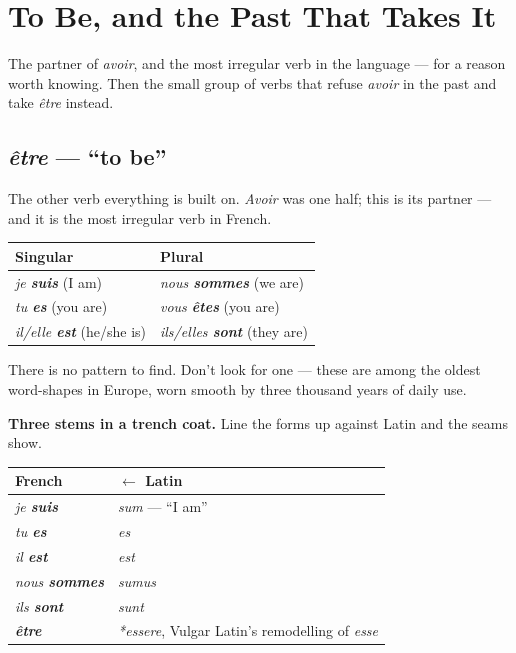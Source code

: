 \chapter{To Be, and the Past That Takes It}
\label{ch:etre}

The partner of \emph{avoir}, and the most irregular verb in the language --- for
a reason worth knowing. Then the small group of verbs that refuse \emph{avoir}
in the past and take \emph{\^{e}tre} instead.

\section{\emph{\^{e}tre} --- ``to be''}
\label{lesson:etre}

The other verb everything is built on. \emph{Avoir} was one half; this is its
partner --- and it is the most irregular verb in French.

\begin{center}
\begin{tabular}{@{}ll@{}}
\toprule
Singular & Plural \\
\midrule
\emph{je \textbf{suis}} (I am) & \emph{nous \textbf{sommes}} (we are) \\
\emph{tu \textbf{es}} (you are) & \emph{vous \textbf{\^{e}tes}} (you are) \\
\emph{il/elle \textbf{est}} (he/she is) & \emph{ils/elles \textbf{sont}} (they are) \\
\bottomrule
\end{tabular}
\end{center}

There is no pattern to find. Don't look for one --- these are among the oldest
word-shapes in Europe, worn smooth by three thousand years of daily use.

\begin{grammarlens}
\textbf{Three stems in a trench coat.} Line the forms up against Latin and the
seams show.
\end{grammarlens}

\begin{center}
\begin{tabular}{@{}ll@{}}
\toprule
French & $\leftarrow$ Latin \\
\midrule
\emph{je \textbf{suis}} & \emph{sum} --- ``I am'' \\
\emph{tu \textbf{es}} & \emph{es} \\
\emph{il \textbf{est}} & \emph{est} \\
\emph{nous \textbf{sommes}} & \emph{sumus} \\
\emph{ils \textbf{sont}} & \emph{sunt} \\
\emph{\textbf{\^{e}tre}} & \emph{*essere}, Vulgar Latin's remodelling of \emph{esse} \\
\bottomrule
\end{tabular}
\end{center}

